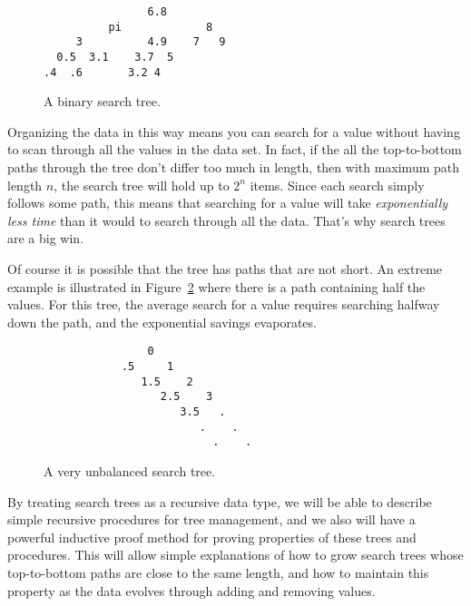 \begin{definition}
\begin{figure}

\begin{center}
\begin{verbatim}
                6.8
          pi             8  
     3          4.9    7   9 
  0.5  3.1    3.7  5
.4  .6       3.2 4 
\end{verbatim}
\end{center}

\caption{A binary search tree.}

\label{searchtree1}

\end{figure}

Organizing the data in this way means you can search for a value
without having to scan through all the values in the data set.  In
fact, if the all the top-to-bottom paths through the tree don't differ
too much in length, then with maximum path length $n$, the search tree
will hold up to $2^n$ items.  Since each search simply follows some
path, this means that searching for a value will take
\emph{exponentially less time} than it would to search through all the
data.  That's why search trees are a big win.

Of course it is possible that the tree has paths that are not short.
An extreme example is illustrated in Figure~\ref{unbalanced} where
there is a path containing half the values.  For this tree, the
average search for a value requires searching halfway down the path,
and the exponential savings evaporates.

\begin{figure}

\begin{center}
\begin{verbatim}
                0
            .5     1
               1.5    2
                  2.5    3
                     3.5   .
                        .    .
                          .    .
\end{verbatim}   
\end{center}

\caption{A very unbalanced search tree.}

\label{unbalanced}

\end{figure}

By treating search trees as a recursive data type, we will be able to
describe simple recursive procedures for tree management, and we also
will have a powerful inductive proof method for proving properties of
these trees and procedures.  This will allow simple explanations of
how to grow search trees whose top-to-bottom paths are close to the
same length, and how to maintain this property as the data evolves
through adding and removing values.


\end{definition}
